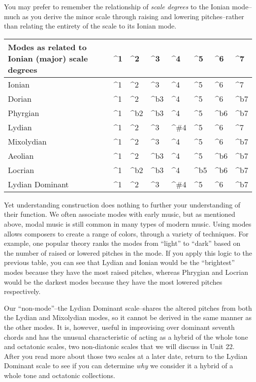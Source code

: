 \documentclass{book}
\begin{document}
You may prefer to remember the relationship of \emph{scale degrees} to the
Ionian mode--much as you derive the minor scale through raising and lowering
pitches--rather than relating the entirety of the scale to its Ionian mode.

\begin{longtable}[]{@{}llllllll@{}}
\toprule
Modes as related to Ionian (major) scale degrees & \^{}1 & \^{}2 & \^{}3 &
\^{}4 & \^{}5 & \^{}6 & \^{}7 \\
\midrule
\endhead
Ionian & \^{}1 & \^{}2 & \^{}3 & \^{}4 & \^{}5 & \^{}6 & \^{}7 \\
Dorian & \^{}1 & \^{}2 & \^{}b3 & \^{}4 & \^{}5 & \^{}6 & \^{}b7 \\
Phyrgian & \^{}1 & \^{}b2 & \^{}b3 & \^{}4 & \^{}5 & \^{}b6 & \^{}b7 \\
Lydian & \^{}1 & \^{}2 & \^{}3 & \^{}\#4 & \^{}5 & \^{}6 & \^{}7 \\
Mixolydian & \^{}1 & \^{}2 & \^{}3 & \^{}4 & \^{}5 & \^{}6 & \^{}b7 \\
Aeolian & \^{}1 & \^{}2 & \^{}b3 & \^{}4 & \^{}5 & \^{}b6 & \^{}b7 \\
Locrian & \^{}1 & \^{}b2 & \^{}b3 & \^{}4 & \^{}b5 & \^{}b6 & \^{}b7 \\
Lydian Dominant & \^{}1 & \^{}2 & \^{}3 & \^{}\#4 & \^{}5 & \^{}6 & \^{}b7 \\
\bottomrule
\end{longtable}

Yet understanding construction does nothing to further your understanding of
their function. We often associate modes with early music, but as mentioned
above, modal music is still common in many types of modern music. Using modes
allows composers to create a range of colors, through a variety of techniques.
For example, one popular theory ranks the modes from ``light'' to ``dark''
based on the number of raised or lowered pitches in the mode. If you apply
this logic to the previous table, you can see that Lydian and Ionian would be
the ``brightest'' modes because they have the most raised pitches, whereas
Phrygian and Locrian would be the darkest modes because they have the most
lowered pitches respectively.

Our ``non-mode''--the Lydian Dominant scale--shares the altered pitches from
both the Lydian and Mixolydian modes, so it cannot be derived in the same
manner as the other modes. It is, however, useful in improvising over dominant
seventh chords and has the unusual characteristic of acting as a hybrid of the
whole tone and octatonic scales, two non-diatonic scales that we will discuss
in Unit 22. After you read more about those two scales at a later date, return
to the Lydian Dominant scale to see if you can determine \emph{why} we
consider it a hybrid of a whole tone and octatonic collections.
\end{document}
